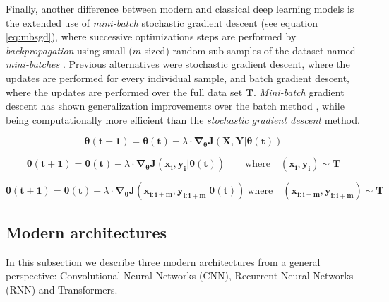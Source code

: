 Finally, another difference between modern and classical deep learning models is the extended use of \textit{mini-batch} stochastic gradient descent (see equation \ref{eq:mbsgd}), where successive optimizations steps are performed by \textit{backpropagation} using small ($m$-sized) random sub samples of the dataset named \textit{mini-batches} \cite{ruder2016}. Previous alternatives were stochastic gradient descent, where the updates are performed for every individual sample, and batch gradient descent, where the updates are performed over the full data set $\mathbf{T}$. \textit{Mini-batch} gradient descent has shown generalization improvements over the batch method \cite{Hoffer2017}, while being computationally more efficient than the \textit{stochastic gradient descent} method.
	

\begin{equation}
	\label{eq:bgd}
	\mathbf{\theta(t+1)} = \mathbf{\theta(t)} - \lambda \cdot \mathbf{\nabla_\theta J(X, Y|\theta(t))}
\end{equation}
	
\begin{equation}
	\label{eq:sgd}
	\mathbf{\theta(t+1)} = \mathbf{\theta(t)} - \lambda \cdot \mathbf{\nabla_\theta J(x_i, y_i|\theta(t))} \quad \mathrm \quad \mathrm{where} \quad (\mathbf{x_i}, \mathbf{y_i}) \sim \mathbf{T}
\end{equation}

\begin{equation}
	\label{eq:mbsgd}
	\mathbf{\theta(t+1)} = \mathbf{\theta(t)} - \lambda \cdot \mathbf{\nabla_\theta J(x_{i:i+m}, y_{i:i+m}|\theta(t))} \  \mathrm{where} \quad  (\mathbf{x_{i:i+m}}, \mathbf{y_{i:i+m}}) \sim \mathbf{T}
\end{equation}


\subsection{Modern architectures}
In this subsection we describe three modern architectures from a general perspective: Convolutional Neural Networks (CNN), Recurrent Neural Networks (RNN) and Transformers.

